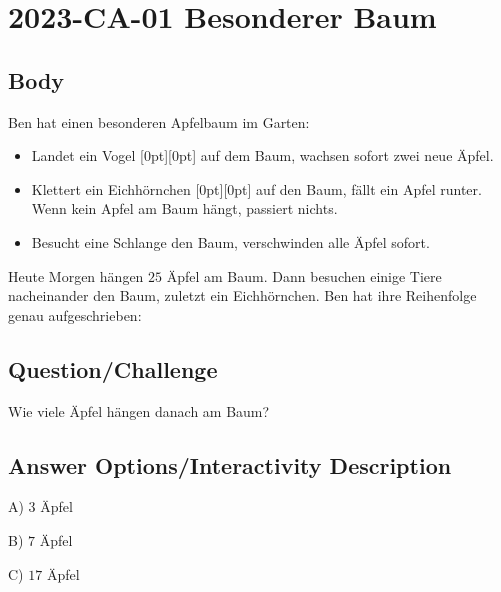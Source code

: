 \documentclass[a4paper,11pt]{report}
\newcommand{\taskGraphicsFolder}{..}
\begin{document}
\section*{\centering{} 2023-CA-01 Besonderer Baum}


\subsection*{Body}

Ben hat einen besonderen Apfelbaum im Garten:

\begin{itemize}
  \item Landet ein Vogel \raisebox{-0.5ex}[0pt][0pt]{} auf dem Baum, wachsen sofort zwei neue Äpfel.
  \item Klettert ein Eichhörnchen \raisebox{-0.5ex}[0pt][0pt]{} auf den Baum, fällt ein Apfel runter. Wenn kein Apfel am Baum hängt, passiert nichts.
  \item Besucht eine Schlange \raisebox{-0.5ex}{} den Baum, verschwinden alle Äpfel sofort.
\end{itemize}

Heute Morgen hängen $25$ Äpfel am Baum. Dann besuchen einige Tiere nacheinander den Baum, zuletzt ein Eichhörnchen. Ben hat ihre Reihenfolge genau aufgeschrieben:

{\centering%
\par}

{\em

\subsection*{Question/Challenge}

Wie viele Äpfel hängen danach am Baum?

}\begingroup
\renewcommand{\arraystretch}{1.5}
\subsection*{Answer Options/Interactivity Description}

A) $3$ Äpfel

B) $7$ Äpfel

C) $17$ Äpfel
\end{document}
